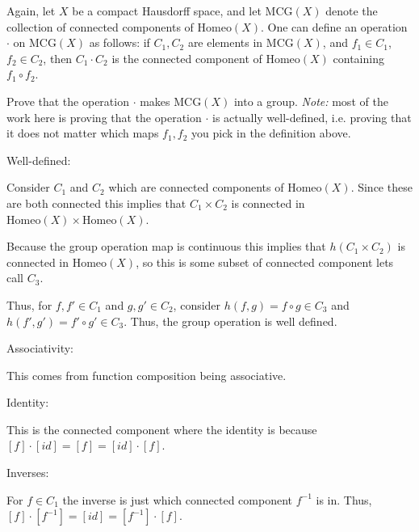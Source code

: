 \documentclass[12pt, letterpaper]{article}
\renewcommand{\t}[1]{\text{#1}}
\begin{document}
\begin{problem}{}
    Again, let $X$ be a compact Hausdorff space, and let
  $\mathrm{MCG}(X)$ denote the collection of connected components of
  $\t{Homeo}(X)$. One can define an operation $\cdot$ on
  $\mathrm{MCG}(X)$ as follows: if $C_1, C_2$ are elements in
  $\mathrm{MCG}(X)$, and $f_1 \in C_1$, $f_2 \in C_2$, then
  $C_1 \cdot C_2$ is the connected component of $\t{Homeo}(X)$ containing
  $f_1 \circ f_2$.

    Prove that the operation $\cdot$ makes $\mathrm{MCG}(X)$ into
    a group. \textit{Note:} most of the work here is proving that the
    operation $\cdot$ is actually well-defined, i.e. proving that it
    does not matter which maps $f_1, f_2$ you pick in the definition
    above.
\end{problem}
\begin{problemproof}
    Well-defined:

    Consider $C_1$ and $C_2$ which are connected components of Homeo$(X)$. Since these are both connected this implies that $C_1 \times C_2$ is connected in $\t{Homeo}(X) \times \t{Homeo}(X)$.

    Because the group operation map is continuous this implies that $h(C_1 \times C_2)$ is connected in $\t{Homeo}(X)$, so this is some subset of connected component lets call $C_3$.
    
    Thus, for $f,f' \in C_1$ and $g,g' \in C_2$, consider $h(f,g)=f\circ g \in C_3$ and $h(f',g')=f' \circ g' \in C_3$. Thus, the group operation is well defined.

    Associativity:

    This comes from function composition being associative.

    Identity:

    This is the connected component where the identity is because $[f] \cdot [id] = [f] = [id] \cdot [f]$.

    Inverses:

    For $f \in C_1$ the inverse is just which connected component $f^{-1}$ is in. Thus, $[f] \cdot [f^{-1}] = [id] = [f^{-1}] \cdot [f]$. 
\end{problemproof}
\end{document}
